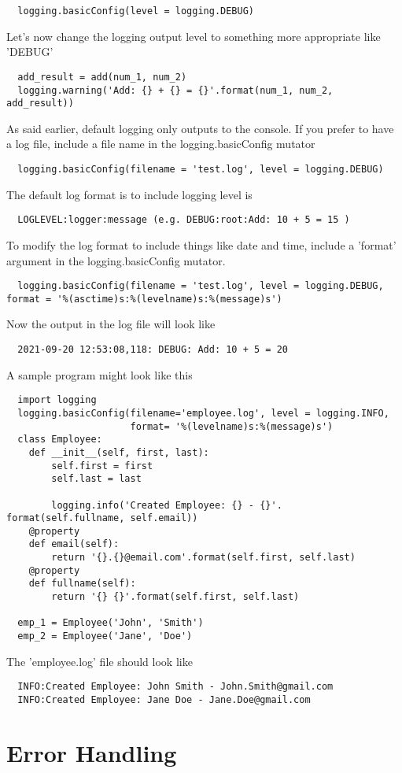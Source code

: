 \documentclass{article}%
\begin{document}
\begin{lstlisting}
  logging.basicConfig(level = logging.DEBUG)
\end{lstlisting}
Let's now change the logging output level to something more appropriate like 'DEBUG'
\begin{lstlisting}
  add_result = add(num_1, num_2)
  logging.warning('Add: {} + {} = {}'.format(num_1, num_2, add_result))
\end{lstlisting}
As said earlier, default logging only outputs to the console. If you prefer to have a log file, include a file name in the logging.basicConfig mutator
\begin{lstlisting}
  logging.basicConfig(filename = 'test.log', level = logging.DEBUG)
\end{lstlisting}
The default log format is to include logging level is 
\begin{lstlisting}
  LOGLEVEL:logger:message (e.g. DEBUG:root:Add: 10 + 5 = 15 )
\end{lstlisting}
To modify the log format to include things like date and time, include a 'format' argument in the logging.basicConfig mutator. 
\begin{lstlisting}
  logging.basicConfig(filename = 'test.log', level = logging.DEBUG, format = '%(asctime)s:%(levelname)s:%(message)s')
\end{lstlisting}
Now the output in the log file will look like
\begin{lstlisting}
  2021-09-20 12:53:08,118: DEBUG: Add: 10 + 5 = 20
\end{lstlisting}
A sample program might look like this
\begin{lstlisting}
  import logging
  logging.basicConfig(filename='employee.log', level = logging.INFO,
                      format= '%(levelname)s:%(message)s')
  class Employee:
    def __init__(self, first, last):
        self.first = first
        self.last = last

        logging.info('Created Employee: {} - {}'. format(self.fullname, self.email))
    @property
    def email(self):
        return '{}.{}@email.com'.format(self.first, self.last)
    @property
    def fullname(self):
        return '{} {}'.format(self.first, self.last)
  
  emp_1 = Employee('John', 'Smith')
  emp_2 = Employee('Jane', 'Doe')
\end{lstlisting}
The 'employee.log' file should look like
\begin{lstlisting}
  INFO:Created Employee: John Smith - John.Smith@gmail.com
  INFO:Created Employee: Jane Doe - Jane.Doe@gmail.com
\end{lstlisting}

\section{Error Handling}
\end{document}
